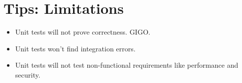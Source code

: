 \documentclass{article}
\begin{document}
\sloppy
\section{Tips: Limitations}
\begin{itemize}
    \item Unit tests will not prove correctness. GIGO.
    \item Unit tests won't find integration errors.
    \item Unit tests will not test non-functional requirements like performance
        and security.
\end{itemize}
\end{document}
